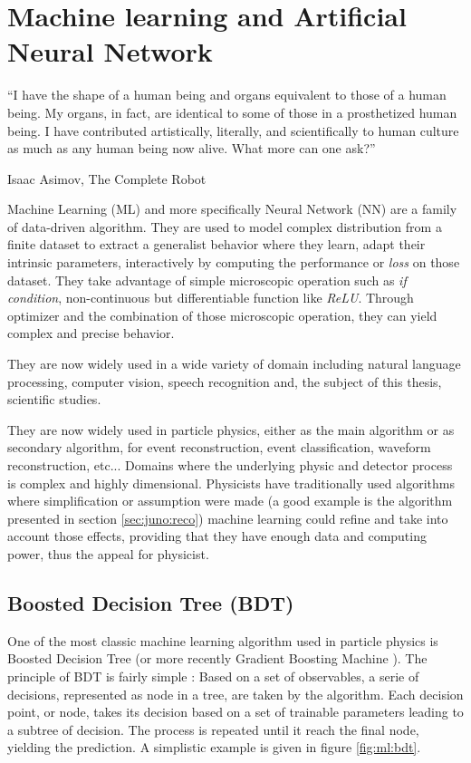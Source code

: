 \chapter{Machine learning and Artificial Neural Network}
\label{sec:ml}

\epigraph{``I have the shape of a human being and organs equivalent to those of a human being. My organs, in fact, are identical to some of those in a prosthetized human being. I have contributed artistically, literally, and scientifically to human culture as much as any human being now alive. What more can one ask?''}{Isaac Asimov, The Complete Robot }

Machine Learning (ML) and more specifically Neural Network (NN) are a family of data-driven algorithm. They are used to model complex distribution from a finite dataset to extract a generalist behavior where they learn, adapt their intrinsic parameters, interactively by computing the performance or \textit{loss} on those dataset. They take advantage of simple microscopic operation such as \textit{if condition}, non-continuous but differentiable function like \textit{ReLU}. Through optimizer and the combination of those microscopic operation, they can yield complex and precise behavior.

They are now widely used in a wide variety of domain including natural language processing, computer vision, speech recognition and, the subject of this thesis, scientific studies.


They are now widely used in particle physics, either as the main algorithm or as secondary algorithm, for event reconstruction, event classification, waveform reconstruction, etc... Domains where the underlying physic and detector process is complex and highly dimensional. Physicists have traditionally used algorithms where simplification or assumption were made (a good example is the algorithm presented in section \ref{sec:juno:reco}) machine learning could refine and take into account those effects, providing that they have enough data and computing power, thus the appeal for physicist.


\section{Boosted Decision Tree (BDT)}
\label{sec:ml:bdt}

One of the most classic machine learning algorithm used in particle physics is Boosted Decision Tree \cite{breiman_classification_2017} (or more recently Gradient Boosting Machine \cite{friedman_greedy_2001}). The principle of BDT is fairly simple : Based on a set of observables, a serie of decisions, represented as node in a tree, are taken by the algorithm. Each decision point, or node, takes its decision based on a set of trainable parameters leading to a subtree of decision. The process is repeated until it reach the final node, yielding the prediction. A simplistic example is given in figure \ref{fig:ml:bdt}.

